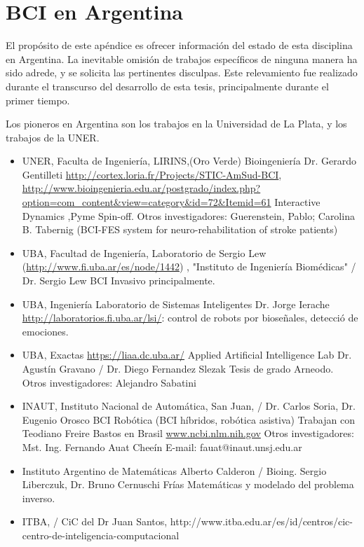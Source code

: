 \chapter{BCI en Argentina}
\label{chapter:ten}
El propósito de este apéndice es ofrecer información del estado de esta disciplina en Argentina.  La inevitable omisión de trabajos específicos de ninguna manera ha sido adrede, y se solicita las pertinentes disculpas.  Este relevamiento fue realizado durante el transcurso del desarrollo de esta tesis, principalmente durante el primer tiempo.

Los pioneros en Argentina son los trabajos en la Universidad de La Plata, y los trabajos de la UNER.

\begin{itemize}
\item UNER, Faculta de Ingeniería, LIRINS,(Oro Verde) Bioingeniería  Dr. Gerardo Gentilleti
\url{http://cortex.loria.fr/Projects/STIC-AmSud-BCI},
\url{http://www.bioingenieria.edu.ar/postgrado/index.php?option=com_content&view=category&id=72&Itemid=61}
Interactive Dynamics ,Pyme Spin-off.
Otros investigadores: Guerenstein, Pablo; Carolina B. Tabernig (BCI-FES system for neuro-rehabilitation of stroke patients)
\item UBA, Facultad de Ingeniería, Laboratorio de Sergio Lew (\url{http://www.fi.uba.ar/es/node/1442}) , "Instituto de Ingeniería Biomédicas" / Dr. Sergio Lew
BCI Invasivo principalmente.
\item UBA, Ingeniería
Laboratorio de Sistemas Inteligentes Dr. Jorge Ierache \url{http://laboratorios.fi.uba.ar/lsi/}: control de robots por bioseñales, detecció de emociones.
\item UBA, Exactas
\url{https://liaa.dc.uba.ar/} Applied Artificial Intelligence Lab Dr. Agustín Gravano / Dr. Diego Fernandez Slezak
Tesis de grado Arneodo.
Otros investigadores: Alejandro Sabatini
\item INAUT, Instituto Nacional de Automática, San Juan, / Dr. Carlos Soria, Dr. Eugenio Orosco
BCI Robótica (BCI híbridos, robótica asistiva)
Trabajan con Teodiano Freire Bastos en Brasil
\url{www.ncbi.nlm.nih.gov}
Otros investigadores: Mst. Ing. Fernando Auat Cheeín
E-mail: fauat@inaut.unsj.edu.ar
\item Instituto Argentino de Matemáticas Alberto Calderon / Bioing. Sergio Liberczuk, Dr. Bruno Cernuschi Frías
Matemáticas y modelado del problema inverso.
\item ITBA, / CiC del Dr Juan Santos, http://www.itba.edu.ar/es/id/centros/cic-centro-de-inteligencia-computacional

\end{itemize}

